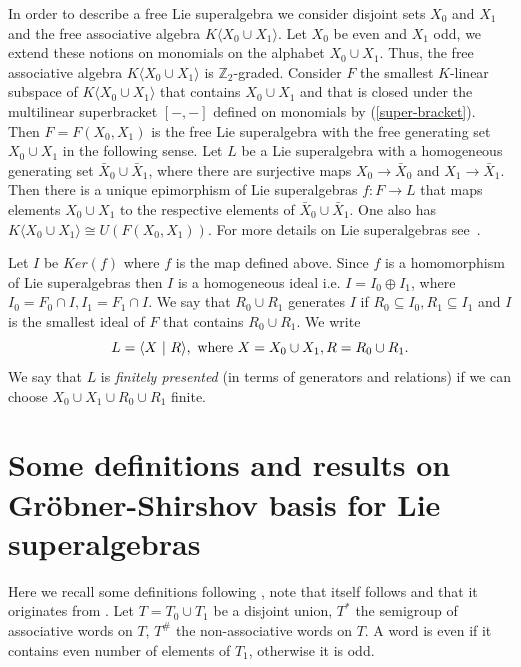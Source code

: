 \documentclass[12pt, reqno]{amsart}
\theoremstyle{remark}
\theoremstyle{definition}
\numberwithin{equation}{section}
\begin{document}
In order to describe a free Lie superalgebra we consider disjoint sets $X_0$ and $X_1$ and the free associative algebra  $K\langle X_0 \cup X_1 \rangle$.
Let $X_0$ be even and $X_1$ odd, we extend these notions on monomials  on the alphabet $X_0 \cup X_1$.
Thus, the free associative algebra  $K\langle X_0 \cup X_1 \rangle$ is $\mathbb Z_2$-graded.
Consider $F$ the smallest $K$-linear subspace of  $K\langle X_0 \cup X_1 \rangle$ that contains $X_0 \cup X_1$ and
that is closed under the  multilinear superbracket $[ - , - ]$ defined on monomials by (\ref{super-bracket}).
Then  $F=F(X_0,X_1)$ is the free  Lie superalgebra
with  the free generating set $X_0 \cup X_1$ in the following sense.
 Let $L$ be a  Lie superalgebra with a  homogeneous generating set $\bar X_0 \cup \bar X_1$,
 where there are surjective maps $X_0 \to \bar  X_0$ and $X_1 \to \bar X_1$.
Then there is a unique epimorphism of Lie superalgebras $f : F \to L$
that maps elements $X_0\cup X_1$ to the respective elements of $\bar X_0 \cup \bar X_1$.
One also has  $ K\langle X_0 \cup X_1 \rangle \cong U(F(X_0,X_1))$. For more details on Lie superalgebras
see~\cite{Ba,BMPZ,Kac77,Scheunert}.

Let $I$ be $Ker(f)$  where $f$ is the map defined above.
Since $f$ is a homomorphism of Lie superalgebras then $I$ is a homogeneous ideal
 i.e.  $I = I_0 \oplus I_1$, where $I_0 = F_0 \cap I, I_1 = F_1 \cap I$.
We say that $R_0 \cup R_1$ generates $I$ if $R_0 \subseteq I_0, R_1 \subseteq I_1$ and $I$ is the smallest ideal of $F$ that contains $R_0 \cup R_1$.
We write
$$L = \langle X \ | \ R \rangle, \hbox{ where } X = X_0 \cup X_1, R = R_0 \cup R_1.$$
We say that $L$ is {\it finitely presented} (in terms of generators and relations)  if we can choose $X_0 \cup X_1 \cup R_0 \cup R_1$  finite.




\section{Some definitions and results on Gr\"obner-Shirshov basis for Lie superalgebras}

 Here we recall some definitions following \cite{L-P-Z}, note that \cite{L-P-Z} 
 itself follows \cite{B-K-L-M}  and that it originates from \cite{M89,BMPZ}.
 Let $T = T_0 \cup T_1$ be a disjoint union, $T^*$ the semigroup of associative words on $T$, 
 $T^{\#}$ the  non-associative words on $T$. A word is even if it contains even number of elements of $T_1$, otherwise it is odd.
\end{document}
